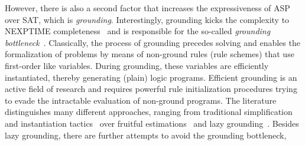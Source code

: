 \documentclass{article}
\begin{document}
However, there is also a second factor that 
increases the expressiveness of ASP over SAT, which is \emph{grounding}. %
Interestingly, grounding kicks the complexity to NEXPTIME completeness~\cite{}
and is responsible for the so-called \emph{grounding bottleneck}~\cite{CuteriEtAl20,TsamouraEtAl20}.
Classically, the process of grounding precedes solving and 
enables the formalization of problems %
by means of non-ground rules (rule schemes) that use first-order like variables.
%
During grounding, these variables are efficiently instantiated,
thereby generating (plain) logic programs.
%
%
%
%
%
%
%
Efficient grounding is an active field of research and requires powerful rule initialization procedures trying to 
evade the intractable evaluation of non-ground programs. %
The literature distinguishes many different approaches, %
ranging from traditional simplification and instantiation tactics~\cite{GebserEtAl19,AlvianoEtAl19,KaminskiSchaub21} over
fruitful estimations~\cite{HippenLierler21} and lazy grounding~\cite{%
BomansonJanhunenWeinzierl19,WeinzierlTaupeFriedrich20}. %
%
%
%
Besides lazy grounding, there are further attempts to avoid the grounding bottleneck, %
\end{document}
